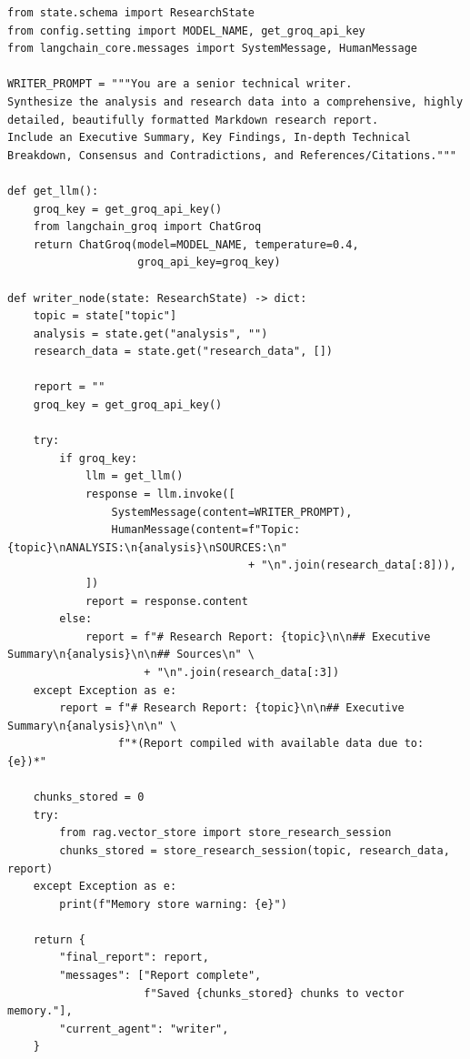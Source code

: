 \documentclass[11pt, a4paper]{article}
\begin{document}
\begin{lstlisting}[style=pythonstyle, caption={agents/writer.py --- Poora Code}]
from state.schema import ResearchState
from config.setting import MODEL_NAME, get_groq_api_key
from langchain_core.messages import SystemMessage, HumanMessage

WRITER_PROMPT = """You are a senior technical writer.
Synthesize the analysis and research data into a comprehensive, highly
detailed, beautifully formatted Markdown research report.
Include an Executive Summary, Key Findings, In-depth Technical
Breakdown, Consensus and Contradictions, and References/Citations."""

def get_llm():
    groq_key = get_groq_api_key()
    from langchain_groq import ChatGroq
    return ChatGroq(model=MODEL_NAME, temperature=0.4,
                    groq_api_key=groq_key)

def writer_node(state: ResearchState) -> dict:
    topic = state["topic"]
    analysis = state.get("analysis", "")
    research_data = state.get("research_data", [])

    report = ""
    groq_key = get_groq_api_key()

    try:
        if groq_key:
            llm = get_llm()
            response = llm.invoke([
                SystemMessage(content=WRITER_PROMPT),
                HumanMessage(content=f"Topic: {topic}\nANALYSIS:\n{analysis}\nSOURCES:\n"
                                     + "\n".join(research_data[:8])),
            ])
            report = response.content
        else:
            report = f"# Research Report: {topic}\n\n## Executive Summary\n{analysis}\n\n## Sources\n" \
                     + "\n".join(research_data[:3])
    except Exception as e:
        report = f"# Research Report: {topic}\n\n## Executive Summary\n{analysis}\n\n" \
                 f"*(Report compiled with available data due to: {e})*"

    chunks_stored = 0
    try:
        from rag.vector_store import store_research_session
        chunks_stored = store_research_session(topic, research_data, report)
    except Exception as e:
        print(f"Memory store warning: {e}")

    return {
        "final_report": report,
        "messages": ["Report complete",
                     f"Saved {chunks_stored} chunks to vector memory."],
        "current_agent": "writer",
    }
\end{lstlisting}
\end{document}
